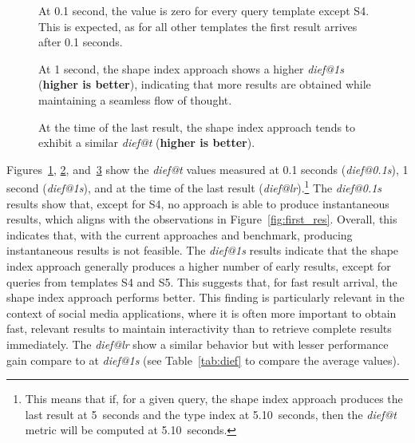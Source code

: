 \begin{figure}
    \centering
    
    \caption{At 0.1 second, the value is zero for every query template except S4. This is expected, as for all other templates the first result arrives after 0.1 seconds.}
    \label{fig:dief_01}
\end{figure}

\begin{figure}
    \centering
    
    \caption{At 1 second, the shape index approach shows a higher \textit{dief@1s} (\textbf{higher is better}), indicating that more results are obtained while maintaining a seamless flow of thought.}
    \label{fig:dief_1}
\end{figure}


\begin{figure}
    \centering
    
    \caption{At the time of the last result, the shape index approach tends to exhibit a similar \textit{dief@t} (\textbf{higher is better}).}
    \label{fig:dief_lr}
\end{figure}

Figures~\ref{fig:dief_01}, \ref{fig:dief_1}, and~\ref{fig:dief_lr} show the \textit{dief@t} values measured at 0.1 seconds (\textit{dief@0.1s}), 1 second (\textit{dief@1s}), and at the time of the last result (\textit{dief@lr}).\footnote{This means that if, for a given query, the shape index approach produces the last result at 5~seconds and the type index at 5.10~seconds, then the \textit{dief@t} metric will be computed at 5.10~seconds.}  
The \textit{dief@0.1s} results show that, except for S4, no approach is able to produce instantaneous results, which aligns with the observations in Figure~\ref{fig:first_res}.  
Overall, this indicates that, with the current approaches and benchmark, producing instantaneous results is not feasible.
The \textit{dief@1s} results indicate that the shape index approach generally produces a higher number of early results, except for queries from templates S4 and S5.  
This suggests that, for fast result arrival, the shape index approach performs better.  
This finding is particularly relevant in the context of social media applications, where it is often more important to obtain fast, relevant results to maintain interactivity than to retrieve complete results immediately.  
The \textit{dief@lr} show a similar behavior but with lesser performance gain compare to at \textit{dief@1s} (see Table~\ref{tab:dief} to compare the average values).

